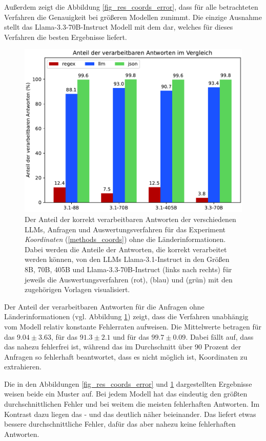 Außerdem zeigt die Abbildung \ref{fig_res_coords_error}, dass für alle betrachteten Verfahren die Genauigkeit bei größeren Modellen zunimmt.
Die einzige Ausnahme stellt das Llama-3.3-70B-Instruct Modell mit dem \llmv{} dar, welches für dieses Verfahren die besten Ergebnisse liefert.

\begin{figure}[tb] %
    \centering
    \includegraphics[width=0.7\columnwidth]{img/size_template_p.pdf}
    \caption{Der Anteil der korrekt verarbeitbaren Antworten der verschiedenen LLMs, Anfragen und Auswertungsverfahren für das Experiment \textit{Koordinaten} (\ref{methods_coords}) ohne die Länderinformationen. Dabei werden die Anteile der Antworten, die korrekt verarbeitet werden können, von den LLMs Llama-3.1-Instruct in den Größen 8B, 70B, 405B und Llama-3.3-70B-Instruct (links nach rechts) für jeweils die Auswertungsverfahren \regex{} (rot), \llm{} (blau) und \json{} (grün) mit den zugehörigen Vorlagen visualisiert.}
    \label{fig_res_coords_p}
\end{figure}

Der Anteil der verarbeitbaren Antworten für die Anfragen ohne Länderinformationen (vgl. Abbildung \ref{fig_res_coords_p}) zeigt, dass die Verfahren unabhängig vom Modell relativ konstante Fehlerraten aufweisen.
Die Mittelwerte betragen für das \regexv{} \( \num{9.04} \pm \num{3.63} \), für das \llmv{} \( \num{91.3} \pm \num{2.1} \) und für das \jsonv{} \( \num{99.7} \pm \num{0.09} \).
Dabei fällt auf, dass das \jsonv{} nahezu fehlerfrei ist, während das \regexv{} im Durchschnitt über 90 Prozent der Anfragen so fehlerhaft beantwortet, dass es nicht möglich ist, Koordinaten zu extrahieren.

Die in den Abbildungen \ref{fig_res_coords_error} und \ref{fig_res_coords_p} dargestellten Ergebnisse weisen beide ein Muster auf.
Bei jedem Modell hat das \regexv{} eindeutig den größten durchschnittlichen Fehler und bei weitem die meisten fehlerhaften Antworten.
Im Kontrast dazu liegen das \json{}- und das \llmv{} deutlich näher beieinander.
Das \llmv{} liefert etwas bessere durchschnittliche Fehler, dafür das \jsonv{} aber nahezu keine fehlerhaften Antworten.

